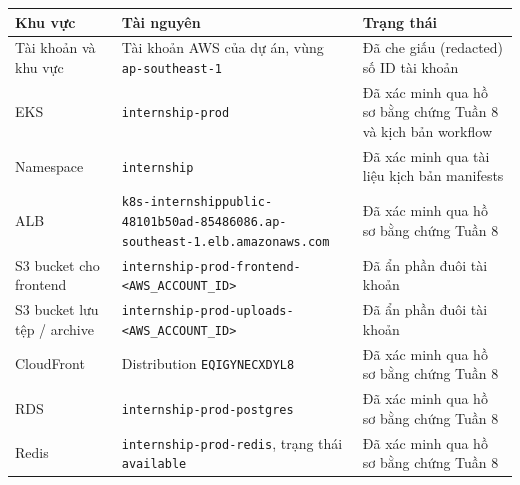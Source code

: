 {
\begingroup
\small
\setlength{\tabcolsep}{3pt}
\renewcommand{\arraystretch}{1.15}
\begin{longtable}{@{}
  >{\raggedright\arraybackslash}p{}
  >{\raggedright\arraybackslash}p{}
  >{\raggedright\arraybackslash}p{}@{}}
\toprule\noalign{}
\begin{minipage}[b]{\linewidth}\raggedright
Khu vực
\end{minipage} & \begin{minipage}[b]{\linewidth}\raggedright
Tài nguyên
\end{minipage} & \begin{minipage}[b]{\linewidth}\raggedright
Trạng thái
\end{minipage} \\
\midrule\noalign{}
\endhead
\bottomrule\noalign{}
\endlastfoot
Tài khoản và khu vực & Tài khoản AWS của dự án, vùng
\texttt{ap-\allowbreak{}southeast-\allowbreak{}1} & Đã che giấu (redacted) số ID tài khoản \\
EKS & \texttt{internship-\allowbreak{}prod} & Đã xác minh qua hồ sơ bằng chứng Tuần 8
và kịch bản workflow \\
Namespace & \texttt{internship} & Đã xác minh qua tài liệu kịch bản
manifests \\
ALB &
\texttt{k8s-\allowbreak{}internshippublic-\allowbreak{}48101b50ad-\allowbreak{}85486086.\allowbreak{}ap-\allowbreak{}southeast-\allowbreak{}1.\allowbreak{}elb.\allowbreak{}amazonaws.\allowbreak{}com}
& Đã xác minh qua hồ sơ bằng chứng Tuần 8 \\
S3 bucket cho frontend &
\texttt{internship-\allowbreak{}prod-\allowbreak{}frontend-\textless{}AWS\_\allowbreak{}ACCOUNT\_\allowbreak{}ID\textgreater{}}
& Đã ẩn phần đuôi tài khoản \\
S3 bucket lưu tệp / archive &
\texttt{internship-\allowbreak{}prod-\allowbreak{}uploads-\textless{}AWS\_\allowbreak{}ACCOUNT\_\allowbreak{}ID\textgreater{}}
& Đã ẩn phần đuôi tài khoản \\
CloudFront & Distribution \texttt{EQIGYNECXDYL8} & Đã xác minh qua hồ sơ
bằng chứng Tuần 8 \\
RDS & \texttt{internship-\allowbreak{}prod-\allowbreak{}postgres} & Đã xác minh qua hồ sơ bằng
chứng Tuần 8 \\
Redis & \texttt{internship-\allowbreak{}prod-\allowbreak{}redis}, trạng thái \texttt{available} &
Đã xác minh qua hồ sơ bằng chứng Tuần 8 \\

\end{longtable}}
